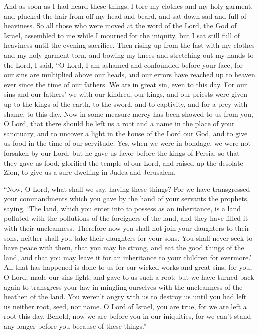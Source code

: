  And as soon as I had heard these things, I tore my
clothes and my holy garment, and plucked the hair from off my head and
beard, and sat down sad and full of heaviness.  So all
those who were moved at the word of the Lord, the God of Israel,
assembled to me while I mourned for the iniquity, but I sat still full
of heaviness until the evening sacrifice.  Then rising up
from the fast with my clothes and my holy garment torn, and bowing my
knees and stretching out my hands to the Lord,  I said,
``O Lord, I am ashamed and confounded before your face, 
for our sins are multiplied above our heads, and our errors have reached
up to heaven  ever since the time of our fathers. We are
in great sin, even to this day.  For our sins and our
fathers' we with our kindred, our kings, and our priests were given up
to the kings of the earth, to the sword, and to captivity, and for a
prey with shame, to this day.  Now in some measure mercy
has been showed to us from you, O Lord, that there should be left us a
root and a name in the place of your sanctuary,  and to
uncover a light in the house of the Lord our God, and to give us food in
the time of our servitude.  Yes, when we were in bondage,
we were not forsaken by our Lord, but he gave us favor before the kings
of Persia, so that they gave us food,  glorified the
temple of our Lord, and raised up the desolate Zion, to give us a sure
dwelling in Judea and Jerusalem.

 ``Now, O Lord, what shall we say, having these things?
For we have transgressed your commandments which you gave by the hand of
your servants the prophets, saying,  `The land, which you
enter into to possess as an inheritance, is a land polluted with the
pollutions of the foreigners of the land, and they have filled it with
their uncleanness.  Therefore now you shall not join your
daughters to their sons, neither shall you take their daughters for your
sons.  You shall never seek to have peace with them, that
you may be strong, and eat the good things of the land, and that you may
leave it for an inheritance to your children for evermore.'
 All that has happened is done to us for our wicked works
and great sins, for you, O Lord, made our sins light, 
and gave to us such a root; but we have turned back again to transgress
your law in mingling ourselves with the uncleanness of the heathen of
the land.  You weren't angry with us to destroy us until
you had left us neither root, seed, nor name.  O Lord of
Israel, you are true, for we are left a root this day. 
Behold, now we are before you in our iniquities, for we can't stand any
longer before you because of these things.''

